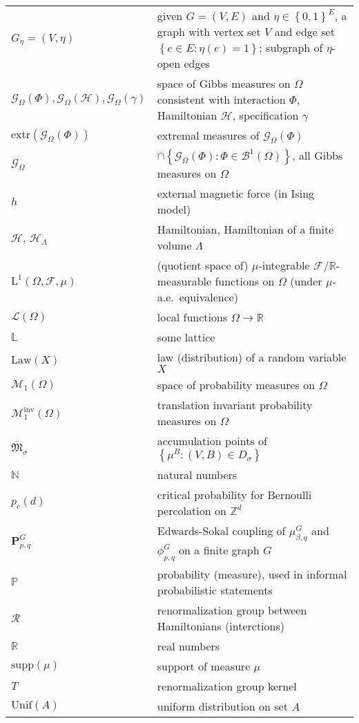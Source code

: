 \documentclass[12pt]{article}
\newcommand{\BB}{\mathscr{B}}
\newcommand{\F}{\mathcal{F}}
\newcommand{\G}{\mathcal{G}}
\renewcommand{\H}{\mathcal{H}}
\newcommand{\Loc}{\mathcal{L}}
\renewcommand{\L}{\mathbb{L}}
\newcommand{\M}{\mathcal{M}}
\newcommand{\N}{\mathbb{N}}
\renewcommand{\P}{\mathbb{P}}
\newcommand{\PP}{\mathbf{P}}
\newcommand{\R}{\mathbb{R}}
\newcommand{\RR}{\mathcal{R}}
\newcommand{\Z}{\mathbb{Z}}
\newcommand{\extr}{\mathrm{extr}}
\newcommand{\set}[1]{\left\{#1\right\}}
\newcommand{\ra}{\rightarrow}
\newcommand{\1}{\mathbbm{1}}
\newcommand{\supp}{\mathrm{supp}}
\newcommand{\5}{\vspace{0.5cm}}
\theoremstyle{definition}
\begin{document}
\pagebreak

\begin{tabular}{p{4cm}p{10cm}}
$G_\eta=(V,\eta)$ & given $G=(V,E)$ and $\eta\in\set{0,1}^E$, a graph with vertex set $V$ and edge set $\set{e\in E:\eta(e)=1}$; subgraph of $\eta$-open edges \\
$\G_\Omega(\Phi),\G_\Omega(\H),\G_\Omega(\gamma)$ & space of Gibbs measures on $\Omega$ consistent with interaction $\Phi$, Hamiltonian $\H$, specification $\gamma$\\
$\extr(\G_\Omega(\Phi))$ & extremal measures of $\G_\Omega(\Phi)$ \\
$\G_\Omega$ & $\cap\set{\G_\Omega(\Phi):\Phi\in\BB^1(\Omega)}$, all Gibbs measures on $\Omega$ \\
$h$ & external magnetic force (in Ising model) \\
$\H$, $\H_\Lambda$ & Hamiltonian, Hamiltonian of a finite volume $\Lambda$ \\
$\mathrm{L}^1(\Omega,\F,\mu)$ & (quotient space of) $\mu$-integrable $\F/\R$-measurable functions on $\Omega$ (under $\mu$-a.e.~equivalence) \\
$\Loc(\Omega)$ & local functions $\Omega\ra\R$ \\
$\L$ & some lattice \\
$\mathrm{Law}(X)$ & law (distribution) of a random variable $X$ \\
$\M_1(\Omega)$ & space of probability measures on $\Omega$ \\
$\M_1^{\mathrm{inv}}(\Omega)$ & translation invariant probability measures on $\Omega$ \\
$\overline{\mathfrak{M}}_{\sigma}$ & accumulation points of $\set{\mu^B:(V,B)\in D_\sigma}$ \\
$\N$ & natural numbers \\
$p_c(d)$ & critical probability for Bernoulli percolation on $\Z^d$ \\
$\PP_{p,q}^G$ & Edwards-Sokal coupling of $\mu_{\beta,q}^G$ and $\phi_{p,q}^G$ on a finite graph $G$ \\
$\P$ & probability (measure), used in informal probabilistic statements \\
$\RR$ & renormalization group between Hamiltonians (interctions) \\
$\R$ & real numbers \\
$\supp(\mu)$ & support of measure $\mu$ \\
$T$ & renormalization group kernel \\
$\mathrm{Unif}(A)$ & uniform distribution on set $A$ \\

\end{tabular}
\end{document}
